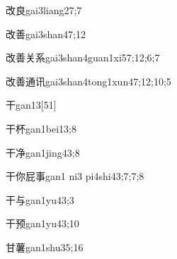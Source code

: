 
\begin{verbete}{改良}{gai3liang2}{7;7}
\end{verbete}

\begin{verbete}{改善}{gai3shan4}{7;12}
\end{verbete}

\begin{verbete}{改善关系}{gai3shan4guan1xi5}{7;12;6;7}
\end{verbete}

\begin{verbete}{改善通讯}{gai3shan4tong1xun4}{7;12;10;5}
\end{verbete}

\begin{verbete}{干}{gan1}{3}[51]
\end{verbete}

\begin{verbete}{干杯}{gan1bei1}{3;8}
\end{verbete}

\begin{verbete}{干净}{gan1jing4}{3;8}
\end{verbete}

\begin{verbete}{干你屁事}{gan1 ni3 pi4shi4}{3;7;7;8}
\end{verbete}

\begin{verbete}{干与}{gan1yu4}{3;3}
\end{verbete}

\begin{verbete}{干预}{gan1yu4}{3;10}
\end{verbete}

\begin{verbete}{甘薯}{gan1shu3}{5;16}
\end{verbete}

